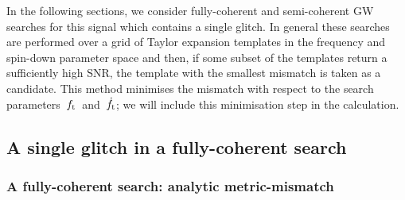 \documentclass[../full_thesis/full_thesis.tex]{subfiles}
\begin{document}
In the following sections, we consider fully-coherent and semi-coherent GW
searches for this signal which contains a single glitch. In general these
searches are performed over a grid of Taylor expansion templates in the
frequency and spin-down parameter space and then, if some subset of the
templates return a sufficiently high SNR, the template with the smallest
mismatch is taken as a candidate. This method minimises the mismatch with
respect to the search parameters~${f_{\textrm{t}}}$~and~$\dot{f}_{\textrm{t}}$; we will include this
minimisation step in the calculation.

\subsection{A single glitch in a fully-coherent search}

\subsubsection{A fully-coherent search: analytic metric-mismatch}
\end{document}
